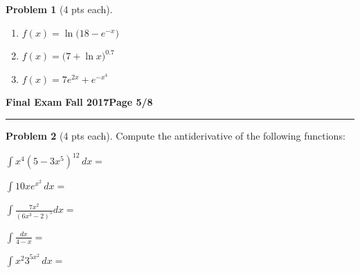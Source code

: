 \documentclass[12pt]{article}
\theoremstyle{definition}
\newtheorem{problem}{Problem}
\begin{document}
\begin{problem}[4 pts each]
\begin{enumerate}
\item $f(x) = \ln \big(18 - e^{-x}\big)$
\begin{flushright}
\end{flushright}
\item $f(x) = \big( 7 + \ln x \big)^{0.7}$
\begin{flushright}
\end{flushright}
\item $f(x) = 7e^{2x} + e^{-x^4}$
\begin{flushright}
\end{flushright}
\end{enumerate}
\end{problem}

\newpage

\hfill{\large\bf Final Exam}\hfill{\large\bf
  Fall 2017}\hfill{\large\bf Page 5/8}\hrule

\bigskip 

\begin{problem}[4 pts each]
Compute the antiderivative of the following functions:
\item $\displaystyle{\int x^4 (5 - 3x^5)^{12}\, dx =}$
\vspace{2cm}
\item $\displaystyle{\int  10xe^{x^2} \, dx =}$
\vspace{2cm}
\item $\displaystyle{\int \frac{7x^2}{(6x^3-2)^5} dx =}$
\vspace{4cm}
\item $\displaystyle{\int \frac{dx}{4-x} =}$
\vspace{4cm}
\item $\displaystyle{\int x^2 3^{5x^2}\, dx =}$
\end{problem}

\newpage
\end{document}
